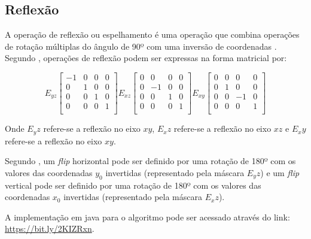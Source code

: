 \documentclass[
	12pt,				%
	oneside,			%
	a4paper,			%
	english,			%
	french,				%
	spanish,			%
	brazil,				%
	]{abntex2}
\begin{document}
\subsection{Reflexão}

A operação de reflexão ou espelhamento é uma operação que combina operações de rotação múltiplas do ângulo de 90º com uma inversão de coordenadas \cite{conciAzevedoLeta:2008}. Segundo \citet{pedriniSchwartz:2008}, operações de reflexão podem ser expressas na forma matricial por:

\[
E_{yz}
\begin{bmatrix}
    -1 & 0 & 0 & 0   \\ 
	 0 & 1 & 0 & 0   \\ 
	 0 & 0 & 1 & 0   \\ 
	 0 & 0 & 0 & 1   \\ 
\end{bmatrix} 
E_{xz}
\begin{bmatrix}
    0 &  0 & 0 & 0   \\ 
	0 & -1 & 0 & 0   \\ 
	0 &  0 & 1 & 0   \\ 
	0 &  0 & 0 & 1   \\ 
\end{bmatrix} 
E_{xy}
\begin{bmatrix}
    0 & 0 &  0 & 0   \\ 
	0 & 1 &  0 & 0   \\ 
	0 & 0 & -1 & 0   \\ 
	0 & 0 &  0 & 1   \\ 
\end{bmatrix} 
\]

Onde \(E_yz\) refere-se a reflexão no eixo \(xy\), \(E_xz\) refere-se a reflexão no eixo \(xz\) e \(E_xy\) refere-se a reflexão no eixo \(xy\).

Segundo \citet{conciAzevedoLeta:2008}, um \textit{flip} horizontal pode ser definido por uma rotação de 180º com os valores das coordenadas \(y_0\) invertidas (representado pela máscara \(E_yz\)) e um \textit{flip} vertical pode ser definido por uma rotação de 180º com os valores das coordenadas \(x_0\) invertidas (representado pela máscara \(E_xz\)).

A implementação em java para o algoritmo pode ser acessado através do link: \url{https://bit.ly/2KIZRxn}.
\end{document}
